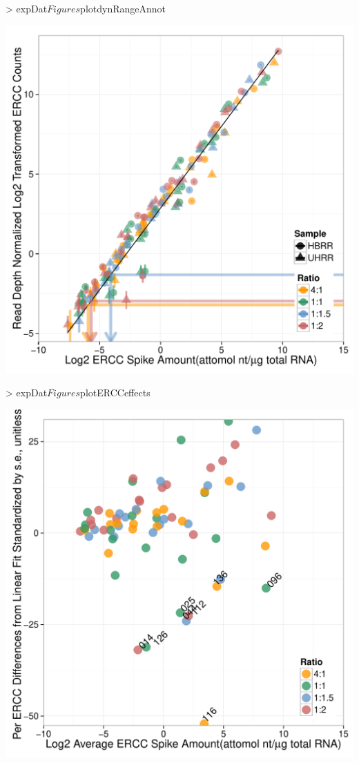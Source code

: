 \documentclass{article}
\begin{document}
\clearpage
\begin{center}
\begin{Schunk}
\begin{Sinput}
> expDat$Figures$plotdynRangeAnnot
\end{Sinput}
\end{Schunk}
\includegraphics{erccdashboardVignette-printPanelDSEQC}
\end{center}
\clearpage
\begin{center}
\begin{Schunk}
\begin{Sinput}
> expDat$Figures$plotERCCeffects
\end{Sinput}
\end{Schunk}
\includegraphics{erccdashboardVignette-printPanelESEQC}
\end{center}
\end{document}
